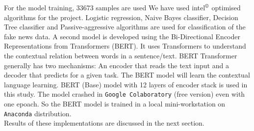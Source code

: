 \documentclass{josis}
\begin{document}
For the model training, 33673 samples are used We have used intel$^\copyright$ optimised algorithms for the project. Logistic regression, Naive Bayes classifier, Decision Tree classifier and Passive-aggressive algorithms are used for classification of the fake news data.
A second model is developed using the Bi-Directional Encoder Representations from Transformers (BERT). It uses Transformers to understand the contextual relation between words in a sentence/text. BERT Transformer generally has two mechanisms: An encoder that reads the text input and a decoder that predicts for a given task. The BERT model will learn the contextual language learning. BERT (Base) model with 12 layers of encoder stack is used in this study. The model crashed in {\texttt{Google Colaboratory}} (free version) even with one epoach. So the BERT model is trained in a local mini-workstation on {\texttt{Anaconda}} distribution.\\
Results of these implementations are discussed in the next section.
\end{document}
